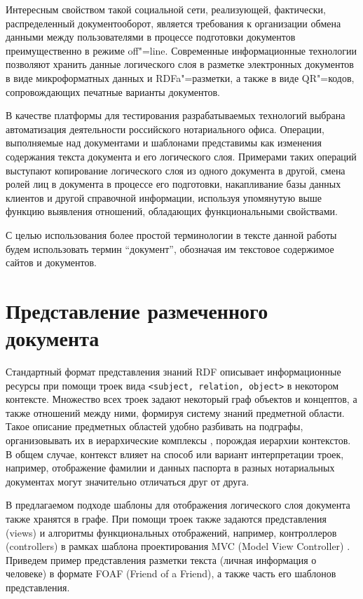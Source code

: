 \documentclass[utf8]{../IncArticle}
\begin{document}
Интересным свойством такой социальной сети, реализующей, фактически,
распределенный документооборот, является требования к организации
обмена данными между пользователями в процессе подготовки документов
преимущественно в режиме off"=line.  Современные информационные
технологии позволяют хранить данные логического слоя в разметке
электронных документов в виде микроформатных данных и RDFa"=разметки,
а также в виде QR"=кодов, сопровождающих печатные варианты документов.

В качестве платформы для тестирования разрабатываемых технологий
выбрана автоматизация деятельности российского нотариального
офиса.  Операции, выполняемые над документами и шаблонами представимы
как изменения содержания текста документа и его логического
слоя.  Примерами таких операций выступают копирование логического слоя
из одного документа в другой, смена ролей лиц в документа в процессе
его подготовки, накапливание базы данных клиентов и другой справочной
информации, используя упомянутую выше функцию выявления отношений,
обладающих функциональными свойствами.

С целью использования более простой терминологии в тексте данной
работы будем использовать термин ``документ'', обозначая им текстовое
содержимое сайтов и документов.

\section{Представление размеченного документа}

Стандартный формат представления знаний RDF описывает информационные
ресурсы при помощи троек вида \texttt{<subject, relation, object>} в
некотором контексте.  Множество всех троек задают некоторый граф
объектов и концептов, а также отношений между ними, формируя
систему знаний предметной области.  Такое описание предметных областей
удобно разбивать на подграфы, организовывать их в иерархические
комплексы \cite{b2:15}, порождая иерархии контекстов.  В общем случае,
контекст влияет на способ или вариант интерпретации троек, например,
отображение фамилии и данных паспорта в разных нотариальных документах
могут значительно отличаться друг от друга.

В предлагаемом подходе \cite{zont2013} шаблоны для отображения
логического слоя документа также хранятся в графе.  При помощи троек
также задаются представления (views) и алгоритмы функциональных
отображений, например, контроллеров (controllers) в рамках шаблона
проектирования MVC (Model View Controller) \cite{b2:5}.  Приведем
пример представления разметки текста (личная информация о человеке) в
формате FOAF (Friend of a Friend), а также часть его шаблонов
представления.
\end{document}

